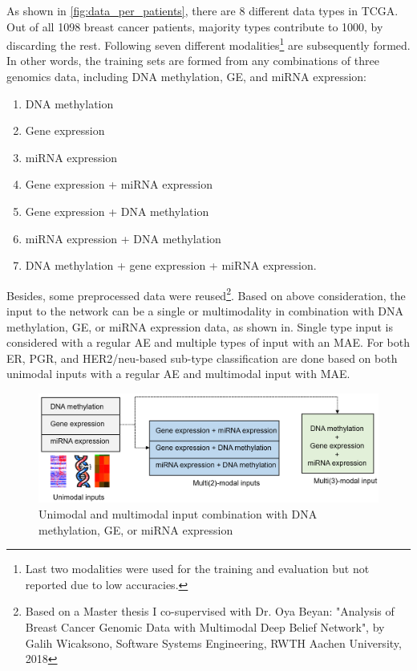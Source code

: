 \hspace*{3.5mm} 
As shown in \cref{fig:data_per_patients}, there are 8 different data types in TCGA. Out of all 1098 breast cancer patients, majority types contribute to 1000, by discarding the rest. Following seven different modalities\footnote{Last two modalities were used for the training and evaluation but not reported due to low accuracies.} are subsequently formed. In other words, the training sets are formed from any combinations of three genomics data, including DNA methylation, GE, and miRNA expression: 

\begin{enumerate}[noitemsep]
    \item DNA methylation 
    \item Gene expression 
    \item miRNA expression 
    \item Gene expression + miRNA expression 
    \item Gene expression + DNA methylation 
    \item miRNA expression + DNA methylation  
    \item DNA methylation + gene expression + miRNA expression. 
\end{enumerate}

\hspace*{3.5mm} Besides, some preprocessed data were reused\footnote{Based on a Master thesis I co-supervised with Dr. Oya Beyan: "Analysis of Breast Cancer Genomic Data with Multimodal Deep Belief Network", by Galih Wicaksono, Software Systems Engineering, RWTH Aachen University, 2018}. Based on above consideration, the input to the network can be a single or multimodality in combination with DNA methylation, GE, or miRNA expression data, as shown in. Single type input is considered with a regular AE and multiple types of input with an MAE. For both ER, PGR, and HER2/neu-based sub-type classification are done based on both unimodal inputs with a regular AE and multimodal input with MAE. %

\begin{figure}
	\centering
	\includegraphics[scale=0.7]{images/input_combination.png}
	\caption[Different uni- and multi-modality input combination]{Unimodal and multimodal input combination with DNA methylation, GE, or miRNA expression}
	\label{fig:input_comb}
\end{figure}

